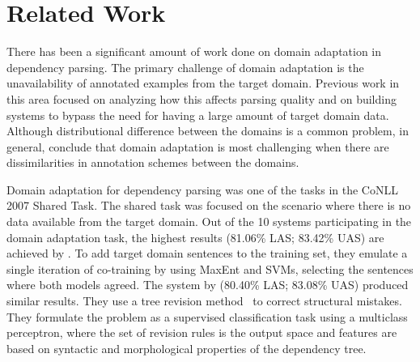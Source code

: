 \section{Related Work} \label{sec:related}

There has been a significant amount of work done on domain adaptation in dependency parsing. The primary challenge of domain adaptation is the unavailability of annotated examples from the target domain. Previous work in this area focused on analyzing how this affects parsing quality and on building systems to bypass the need for having a large amount of target domain data. Although distributional difference between the domains is a common problem,  in general, \citet{dredze2007frustratingly} conclude that domain adaptation is most challenging when there are dissimilarities in annotation schemes between the domains. %

Domain adaptation for dependency parsing was one of the tasks in the CoNLL 2007 Shared Task. %
The shared task was focused on the scenario where there is no data available from the target domain. Out of the 10 systems participating in the domain adaptation task, the highest results (81.06\% LAS; 83.42\% UAS) are achieved by \citet{sagae2007dependency}. To add target domain sentences to the training set, they emulate a single iteration of co-training by using MaxEnt and SVMs, selecting the sentences where both models agreed. The system by \citet{attardi2007tree} (80.40\% LAS; 83.08\% UAS) produced similar results. They use a tree revision method~\cite{attardi2007tree} to correct structural mistakes. %
They formulate the problem as a supervised classification task using a multiclass perceptron, where the set of revision rules is the output space and features are based on syntactic and morphological properties of the dependency tree. %



